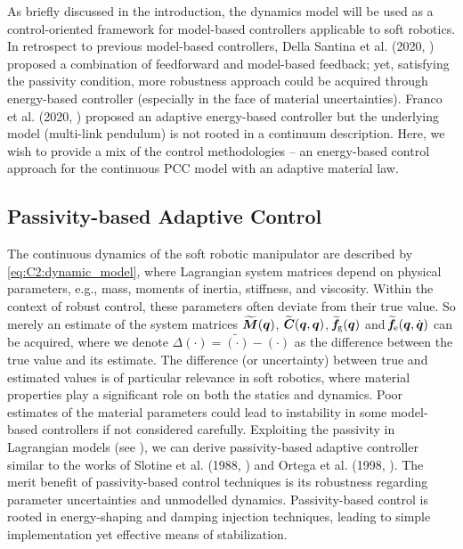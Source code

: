 \noindent As briefly discussed in the introduction, the dynamics model will be used as a control-oriented framework for model-based controllers applicable to soft robotics. In retrospect to previous model-based controllers, Della Santina et al. (2020, \cite{DellaSantina2020}) proposed a combination of feedforward and model-based feedback; yet, satisfying the passivity condition, more robustness approach could be acquired through energy-based controller (especially in the face of material uncertainties). Franco et al. (2020, \cite{Franco2020}) proposed an adaptive energy-based controller but the underlying model (multi-link pendulum) is not rooted in a continuum description. Here, we wish to provide a mix of the control methodologies -- an energy-based control approach for the continuous PCC model with an adaptive material law.
%
\subsection{Passivity-based Adaptive Control}
\noindent The continuous dynamics of the soft robotic manipulator are described by \eqref{eq:C2:dynamic_model}, where Lagrangian system matrices depend on physical parameters, e.g., mass, moments of inertia, stiffness, and viscosity. Within the context of robust control, these parameters often deviate from their true value. So merely an estimate of the system matrices $\widetilde{\boldsymbol{M}}({\boldsymbol{q}})$, $\widetilde{\boldsymbol{C}}({\boldsymbol{q}},{\boldsymbol{q}})$, $\widetilde{\!\boldsymbol{f}}\!_{\scriptstyle\textrm{g}}({\boldsymbol{q}})$ and $\widetilde{\!\boldsymbol{f}}\!_{\scriptstyle\textrm{e}}({\boldsymbol{q}},{\dot{\boldsymbol{q}}})$ can be acquired, where we denote $
\Delta (\cdot) = \tilde{(\cdot)} - (\cdot)$ as the difference between the true value and its estimate. The difference (or uncertainty) between true and estimated values is of particular relevance in soft robotics, where material properties play a significant role on both the statics and dynamics. Poor estimates of the material parameters could lead to instability in some model-based controllers if not considered carefully. Exploiting the passivity in Lagrangian models (see ), we can derive passivity-based adaptive controller similar to the works of Slotine et al. (1988, \cite{Slotine1988}) and Ortega et al. (1998, \cite{Ortega1998}). The merit benefit of passivity-based control techniques is its robustness regarding parameter uncertainties and unmodelled dynamics. Passivity-based control is rooted in energy-shaping and damping injection techniques, leading to simple implementation yet effective means of stabilization.
%

